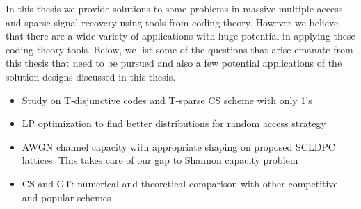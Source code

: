 In this thesis we provide solutions to some problems in massive multiple access and sparse signal recovery using tools from coding theory. However we believe that there are a wide variety of applications with huge potential in applying these coding theory tools. Below, we list some of the questions that arise emanate from this thesis that need to be pursued and also a few potential applications of the solution designs discussed in this thesis.

\begin{itemize}
\item Study on T-disjunctive codes and T-sparse CS scheme with only 1's
\item LP optimization to find better distributions for random access strategy
\item AWGN channel capacity with appropriate shaping on proposed SCLDPC lattices. This takes care of our gap to Shannon capacity problem
\item CS and GT: numerical and theoretical comparison with other competitive and popular schemes
\end{itemize}
